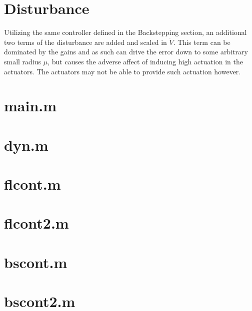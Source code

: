 \documentclass{article}
\begin{document}
\section{Disturbance}
Utilizing the same controller defined in the Backstepping section, an additional two terms of the disturbance are added and scaled in $\dot{V}$. This term can be dominated by the gains and as such can drive the error down to some arbitrary small radius $\mu$, but causes the adverse affect of inducing high actuation in the actuators. The actuators may not be able to provide such actuation however.

\newpage
\section{main.m}

\section{dyn.m}

\section{flcont.m}

\section{flcont2.m}

\section{bscont.m}

\section{bscont2.m}

\end{document}
